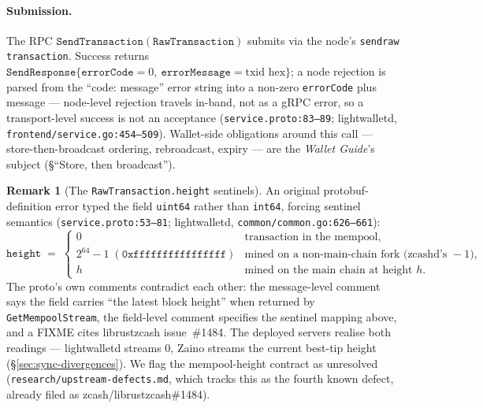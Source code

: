 \documentclass[11pt,a4paper]{article}
\theoremstyle{definition}
\newtheorem{remark}[theorem]{Remark}
\begin{document}
\paragraph{Submission.} The RPC
$\mathtt{SendTransaction}$\allowbreak$(\mathtt{RawTransaction})$ submits
via the
node's \texttt{send}\allowbreak\texttt{raw}\allowbreak
\texttt{transaction}. Success returns
$\mathtt{SendResponse}\{\mathtt{errorCode}{=}0,\
\mathtt{errorMessage}{=}\text{txid hex}\}$; a node rejection is parsed
from the ``code: message'' error string into a non-zero
\texttt{errorCode} plus message --- node-level rejection travels in-band,
not as a gRPC error, so a transport-level success is not an acceptance
(\texttt{service.proto:83--89}; \textsf{lightwalletd},
\texttt{frontend/service.go:454--509}). Wallet-side obligations around
this call --- store-then-broadcast ordering, rebroadcast, expiry --- are
the \emph{Wallet Guide}'s subject (\S``Store, then broadcast'').

\begin{remark}[The \texttt{RawTransaction.height} sentinels]
\label{rem:sync-height-sentinel}
An original protobuf-definition error typed the field \texttt{uint64}
rather than \texttt{int64}, forcing sentinel semantics
(\texttt{service.proto:53--81}; \textsf{lightwalletd},
\texttt{common/common.go:626--661}):
\[
\mathtt{height} \;=\;
\begin{cases}
0 & \text{transaction in the mempool,}\\
2^{64}-1 \; (\mathtt{0xffffffffffffffff}) &
  \text{mined on a non-main-chain fork (zcashd's } -1\text{),}\\
h & \text{mined on the main chain at height } h.
\end{cases}
\]
The proto's own comments contradict each other: the message-level comment
says the field carries ``the latest block height'' when returned by
\texttt{GetMempoolStream}, the field-level comment specifies the sentinel
mapping above, and a FIXME cites librustzcash issue~\#1484. The deployed
servers realise both readings --- lightwalletd streams $0$, Zaino streams
the current best-tip height (\S\ref{sec:sync-divergences}). We flag the
mempool-height contract as unresolved
(\texttt{research/upstream-defects.md}, which tracks this as the fourth
known defect, already filed as zcash/librustzcash\#1484).
\end{remark}
\end{document}
